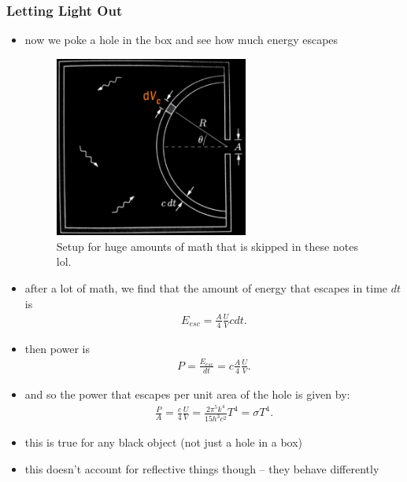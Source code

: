 \documentclass[10pt]{article}
\begin{document}
\subsubsection*{Letting Light Out}
\begin{itemize}
    \item now we poke a hole in the box and see how much energy escapes 
        \begin{figure}[h]
            \centering
            \includegraphics[width=0.6\textwidth]{blackbodyHole}
            \caption{Setup for huge amounts of math that is skipped in these notes lol.}
            \label{fig:blackbodyHole}
        \end{figure}
    \item after a lot of math, we find that the amount of energy that escapes in time $dt$ is 
        \begin{gather*}
            E_{esc} = \frac{A}{4} \frac{U}{V} cdt 
        .\end{gather*}
    \item then power is 
        \begin{gather*}
            P = \frac{E_{esc}}{dt} = c \frac{A}{4} \frac{U}{V}
        .\end{gather*}
    \item and so the power that escapes per unit area of the hole is given by: 
        \begin{gather*}
            \frac{P}{A} = \frac{c}{4} \frac{U}{V} = \frac{2\pi^5 k^4}{15h^3c^2} T^4 = \sigma T^4
        .\end{gather*}
    \item this is true for any black object (not just a hole in a box)
    \item this doesn't account for reflective things though -- they behave differently
\end{itemize}
\end{document}
